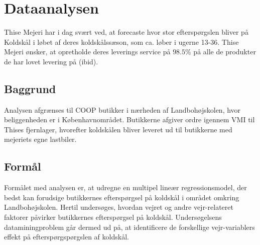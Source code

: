 \documentclass[
  12pt,
  a4paper,
  DIV=11,
  numbers=noendperiod]{scrartcl}
\begin{document}
\hypertarget{dataanalysen}{%
\section{Dataanalysen}\label{dataanalysen}}

Thise Mejeri har i dag svært ved, at forecaste hvor stor efterspørgslen
bliver på Koldskål i løbet af deres koldskålssæson, som ca. løber i
ugerne 13-36. Thise Mejeri ønsker, at opretholde deres leverings service
på \(98.5\%\) på alle de produkter de har lovet levering på (ibid).

\hypertarget{baggrund}{%
\subsection{Baggrund}\label{baggrund}}

Analysen afgrænses til COOP butikker i nærheden af Landbohøjskolen, hvor
beliggenheden er i Københavnområdet. Butikkerne afgiver ordre igennem
VMI til Thises fjernlager, hvorefter koldskålen bliver leveret ud til
butikkerne med mejeriets egne lastbiler.

\hypertarget{formuxe5l}{%
\subsection{Formål}\label{formuxe5l}}

Formålet med analysen er, at udregne en multipel lineær
regressionsmodel, der bedst kan forudsige butikkernes efterspørgsel på
koldskål i området omkring Landbohøjskolen. Hertil undersøges, hvordan
vejret og andre vejr-relateret faktorer påvirker butikkernes
efterspørgsel på koldskål. Undersøgelsens dataminingproblem går dermed
ud på, at identificere de forskellige vejr-variablers effekt på
efterspørgspørgslen af koldskål.
\end{document}

